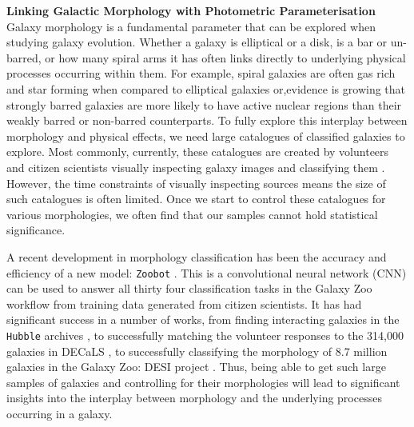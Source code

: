 \documentclass[11pt,usenatbib]{article}
\begin{document}
\vspace{-5mm}
\justification
\vspace{-3mm}
\noindent\textbf{Linking Galactic Morphology with Photometric Parameterisation} \\
Galaxy morphology is a fundamental parameter that can be explored when studying galaxy evolution. Whether a galaxy is elliptical or a disk, is a bar or un-barred, or how many spiral arms it has often links directly to underlying physical processes occurring within them. For example, spiral galaxies are often gas rich and star forming \cite{this?} when compared to elliptical galaxies or,evidence is growing that strongly barred galaxies are more likely to have active nuclear regions than their weakly barred or non-barred counterparts. To fully explore this interplay between morphology and physical effects, we need large catalogues of classified galaxies to explore. Most commonly, currently, these catalogues are created by volunteers and citizen scientists visually inspecting galaxy images and classifying them \cite{see Galaxy Zoo}. However, the time constraints of visually inspecting sources means the size of such catalogues is often limited. Once we start to control these catalogues for various morphologies, we often find that our samples cannot hold statistical significance.

A recent development in morphology classification has been the accuracy and efficiency of a new model: \texttt{Zoobot} \cite{2023JOSS....8.5312W}. This is a convolutional neural network (CNN) can be used to answer all thirty four classification tasks in the Galaxy Zoo \cite{galaxy zoo} workflow from training data generated from citizen scientists. It has had significant success in a number of works, from finding interacting galaxies in the \texttt{Hubble} archives \cite{2023ApJ...948...40O}, to successfully matching the volunteer responses to the 314,000 galaxies in DECaLS \cite{2022MNRAS.509.3966W}, to successfully classifying the morphology of 8.7 million galaxies in the Galaxy Zoo: DESI project \cite{mikes..paper}. Thus, being able to get such large samples of galaxies and controlling for their morphologies will lead to significant insights into the interplay between morphology and the underlying processes occurring in a galaxy. 
\end{document}
